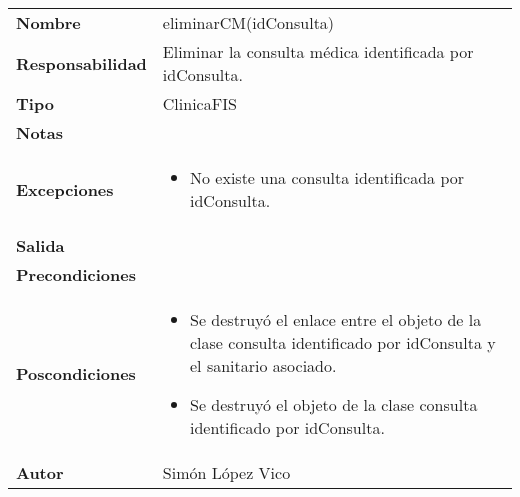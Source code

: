 \documentclass[11pt,a4paper]{article}
\begin{document}
\begin{table}[H]
	\centering
	\label{my-label}
	\begin{tabularx}{\textwidth}{l|X}
		\textbf{Nombre}          & eliminarCM(idConsulta)\\
		\textbf{Responsabilidad} & Eliminar la consulta médica identificada por idConsulta. \\
		\textbf{Tipo}            & ClinicaFIS \\
		\textbf{Notas}           &  \\
		\textbf{Excepciones}     &
		\begin{itemize}
			\item No existe una consulta identificada por idConsulta.
		\end{itemize} \\
		\textbf{Salida}          &  \\
		\textbf{Precondiciones}  &  \\
		\textbf{Poscondiciones}  & 
		\begin{itemize}
			\item Se destruyó el enlace entre el objeto de la clase consulta identificado por idConsulta y el sanitario asociado.
			\item Se destruyó el objeto de la clase consulta identificado por idConsulta.
		\end{itemize} \\
		\textbf{Autor}			 & Simón López Vico
	\end{tabularx}
\end{table}
\end{document}
